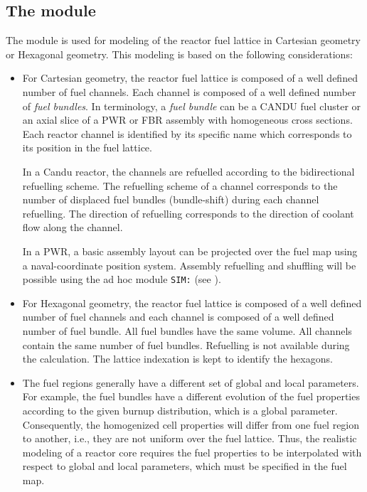 \subsection{The  module}\label{sect:resini}

\vskip 0.2cm
The  module is used for modeling of the reactor fuel
lattice in  Cartesian geometry or  Hexagonal geometry. 
This modeling is based on the following considerations:

\begin{itemize}

\item For  Cartesian geometry, the reactor fuel lattice is composed of 
a well defined number of fuel channels. Each channel is composed of a well defined 
number of {\sl fuel bundles}. In  terminology, a {\sl fuel bundle}
can be a CANDU fuel cluster or an axial slice of a PWR or FBR assembly with
homogeneous cross sections. Each reactor channel is identified by its specific name
which corresponds to its position in the fuel lattice.

\vskip 0.08cm

In a Candu reactor, the channels are refuelled according
to the bidirectional refuelling scheme. The refuelling scheme of a channel
corresponds to the number of displaced fuel bundles (bundle-shift) during
each channel refuelling. The direction of refuelling corresponds to the
direction of coolant flow along the channel. 

\vskip 0.08cm

In a PWR, a basic assembly layout can be projected over the fuel map using a
naval-coordinate position system. Assembly refuelling and shuffling will be possible using
the ad hoc module {\tt SIM:} (see ).

\item For  Hexagonal geometry, the reactor fuel lattice is composed of
a well defined number of fuel channels and each channel is composed of a well defined
number of fuel bundle. All fuel bundles have the same volume. All channels contain
the same number of fuel bundles. Refuelling is not available during the calculation. The
lattice indexation is kept to identify the hexagons.

\item The fuel regions generally have a different set of global and local
parameters. For example, the fuel bundles have a different evolution of the
fuel properties according to the given burnup distribution, which is a global
parameter. Consequently, the homogenized cell properties will differ from one
fuel region to another, i.e., they are not uniform over the fuel lattice. Thus,
the realistic modeling of a reactor core requires the fuel properties to be
interpolated with respect to global and local parameters, which must be
specified in the fuel map.

\end{itemize}

